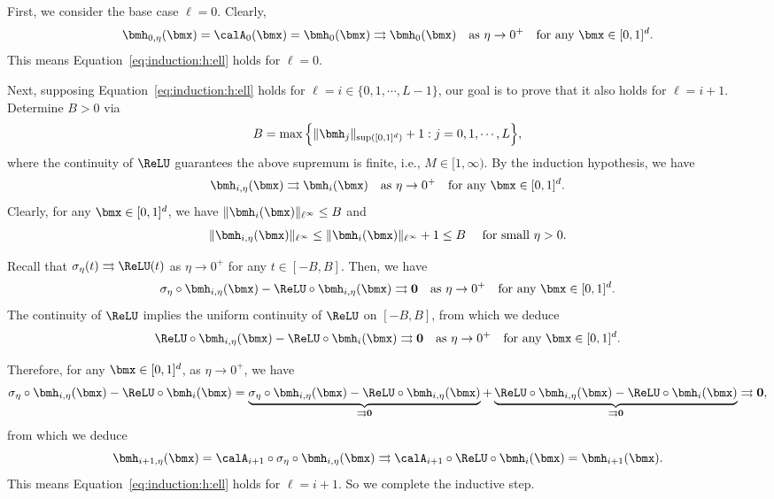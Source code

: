 \documentclass[11pt,a4paper]{article}
\begin{document}
	
	First, we consider the base case $\ell=0$. Clearly,
	\begin{equation*}
		\bmh_{0,\eta}(\bmx)=\calA_0(\bmx)= \bmh_{0}(\bmx)\rightrightarrows \bmh_{0}(\bmx) \quad \tn{as}\  \eta\to 0^+\quad \tn{for any $\bmx\in[0,1]^d$.}
	\end{equation*}
	This means Equation~\eqref{eq:induction:h:ell} holds for $\ell=0$.
	
	Next, supposing Equation~\eqref{eq:induction:h:ell} holds for $\ell=i\in \{0,1,\cdots,L-1\}$, our goal is to prove that it also holds for $\ell=i+1$. Determine $B>0$ via
	\begin{equation*}
		B=  \max \Big\{\|\bmh_j\|_{\sup([0,1]^d)}+1:
		 j=0,1,\cdots,L \Big\},
	\end{equation*}
	where the continuity of $\ReLU$ guarantees the above supremum is finite, i.e., $M\in [1,\infty)$.
	By the induction hypothesis, we have
	\begin{equation*}
		\bmh_{i,\eta}(\bmx)\rightrightarrows \bmh_{i}(\bmx) \quad \tn{as}\    \eta\to 0^+\quad \tn{for any $\bmx\in [0,1]^d$.}
	\end{equation*}
	Clearly, for any $\bmx\in [0,1]^d$, we have $\|\bmh_{i}(\bmx)\|_{\ell^\infty}\le B$ and  \begin{equation*}
	    \|\bmh_{i,\eta}(\bmx)\|_{\ell^\infty} \le \|\bmh_{i}(\bmx)\|_{\ell^\infty}+1\le  B\quad \tn{ for small $\eta>0$.}
	\end{equation*}
	
	Recall that $\sigma_\eta(t)\rightrightarrows \ReLU(t)$ as $\eta\to 0^+ $ for any $t\in [-B,B]$. Then, we have 
	\begin{equation*}
		\sigma_\eta\circ \bmh_{i,\eta}(\bmx)
		-\ReLU\circ \bmh_{i,\eta}(\bmx)
		\rightrightarrows \bmzero\quad \tn{as}\   \eta\to 0^+ \quad \tn{for any $\bmx\in [0,1]^d$.}
	\end{equation*}
	The continuity of $\ReLU$ implies
	the uniform continuity of $\ReLU$ on $[-B,B]$, from which we deduce
	\begin{equation*}
		\ReLU\circ \bmh_{i,\eta}(\bmx)
		-
		\ReLU\circ\bmh_{i}(\bmx) 
		\rightrightarrows \bmzero
		\quad \tn{as}\    \eta\to 0 ^+\quad \tn{for any $\bmx\in [0,1]^d$.}
	\end{equation*}
	
	
	
	Therefore, for any $\bmx\in [0,1]^d$, as $\eta\to 0^+ $, we have
	\begin{equation*}
		\sigma_\eta\circ \bmh_{i,\eta}(\bmx)
		-
		\ReLU\circ\bmh_{i}(\bmx) 
		=
		\underbrace{
			\sigma_\eta\circ \bmh_{i,\eta}(\bmx)
			-\ReLU\circ \bmh_{i,\eta}(\bmx)
		}_{\rightrightarrows \bmzero}
		+
		\underbrace{\ReLU\circ \bmh_{i,\eta}(\bmx)
			-
			\ReLU\circ\bmh_{i}(\bmx) 
		}_{\rightrightarrows \bmzero}
		\rightrightarrows \bmzero,
	\end{equation*}
	from which we deduce
	\begin{equation*}
		\bmh_{i+1,\eta}(\bmx)=\calA_{i+1}\circ\sigma_\eta\circ \bmh_{i,\eta}(\bmx)
		\rightrightarrows
		\calA_{i+1}\circ\ReLU\circ \bmh_{i}(\bmx)=\bmh_{i+1}(\bmx).
	\end{equation*}
	This means Equation~\eqref{eq:induction:h:ell} holds for $\ell=i+1$. So we complete the inductive step.
	
\end{document}
